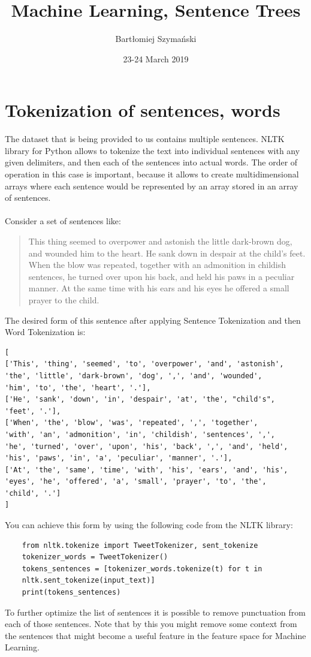 \documentclass{article}
\title{Machine Learning, Sentence Trees}
\author{Bartłomiej Szymański}
\date{23-24 March 2019}
\begin{document}
\maketitle

\section{Tokenization of sentences, words}
The dataset that is being provided to us contains multiple sentences. NLTK library for Python allows to tokenize\cite{Tokenization} the text into individual sentences with any given delimiters, and then each of the sentences into actual words. The order of operation in this case is important, because it allows to create multidimensional arrays where each sentence would be represented by an array stored in an array of sentences.\\ \\
Consider a set of sentences like:
\begin{quote}
This thing seemed to overpower and astonish the little dark-brown dog, and wounded him to the heart. He sank down in despair at the child's feet. When the blow was repeated, together with an admonition in childish sentences, he turned over upon his back, and held his paws in a peculiar manner. At the same time with his ears and his eyes he offered a small prayer to the child.
\end{quote}
The desired form of this sentence after applying Sentence Tokenization and then Word Tokenization is:
\begin{verbatim}
[
['This', 'thing', 'seemed', 'to', 'overpower', 'and', 'astonish', 
'the', 'little', 'dark-brown', 'dog', ',', 'and', 'wounded', 
'him', 'to', 'the', 'heart', '.'],
['He', 'sank', 'down', 'in', 'despair', 'at', 'the', "child's", 
'feet', '.'],
['When', 'the', 'blow', 'was', 'repeated', ',', 'together', 
'with', 'an', 'admonition', 'in', 'childish', 'sentences', ',', 
'he', 'turned', 'over', 'upon', 'his', 'back', ',', 'and', 'held', 
'his', 'paws', 'in', 'a', 'peculiar', 'manner', '.'],
['At', 'the', 'same', 'time', 'with', 'his', 'ears', 'and', 'his', 
'eyes', 'he', 'offered', 'a', 'small', 'prayer', 'to', 'the', 
'child', '.']
]
\end{verbatim}
You can achieve this form by using the following code from the NLTK library\cite{Demo of TweetTokenizer}:
\begin{verbatim}
    from nltk.tokenize import TweetTokenizer, sent_tokenize
    tokenizer_words = TweetTokenizer()
    tokens_sentences = [tokenizer_words.tokenize(t) for t in
    nltk.sent_tokenize(input_text)]
    print(tokens_sentences)
\end{verbatim}
To further optimize the list of sentences it is possible to remove punctuation from each of those sentences. Note that by this you might remove some context from the sentences that might become a useful feature in the feature space for Machine Learning.
\end{document}
